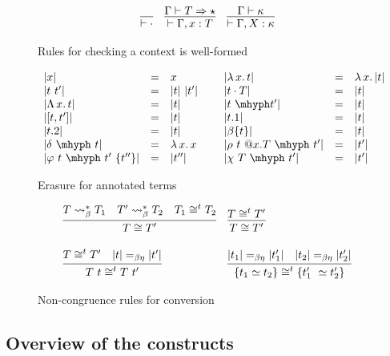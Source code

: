 \documentclass{article}
\newcommand{\absu}[3]{{#1}\, #2.\, #3}
\newcommand{\tpsynth}[0]{\Rightarrow}
\begin{document}
\begin{figure}
  \centering
  \[
    \begin{array}{lll}
      \infer{\vdash \cdot}{}
      & \infer{
        \vdash \Gamma,x:T
        }{\Gamma \vdash T \tpsynth \star}
      & \infer{
        \vdash \Gamma,X:\kappa
        }{
        \Gamma \vdash \kappa
        }
    \end{array}
  \]
  \caption{Rules for checking a context is well-formed}
  \label{fig:ctxt}
\end{figure}


\begin{figure}
  \[
  \begin{array}{lllllll}
    |x| & = & x &\ &
    |\absu{\lambda}{x}{t}| & = & \absu{\lambda}{x}{|t|} \\
    |t\ t'| & = & |t|\ |t'| &\ &
    |t\cdot T| & = & |t| \\
    |\absu{\Lambda}{x}{t}| & = & |t| &\ &
    |t\ \mhyph t'| & = & |t| \\
    |[t , t']| & = & |t| &\ &
    |t.1| & = & |t| \\
    |t.2| & = & |t| &\ &
    |\beta\{t\}| & = & |t|\\
    |\delta\ \mhyph\ t| & = & \absu{\lambda}{x}{x}&\ &
    |\rho\ t\ @x.T\ \mhyph\ t'| & = & |t'| \\
    |\varphi\ t\ \mhyph\ t'\ \{t''\}| & = & |t''| &\ &
    |\chi\ T\ \mhyph\ t'| & = & |t'|
  \end{array}
  \]
  \caption{Erasure for annotated terms}
  \label{fig:eraser}
\end{figure}  

\begin{figure}
  \[
  \begin{array}{ll}
    \infer{T \cong T'}{T \leadsto^*_\beta T_1 & T' \leadsto^*_\beta T_2 & T_1\cong^t T_2}  & 
    \infer{T \cong T'}{T \cong^t T'} \\ \\
    \infer{T\ t \cong^t T\ t'}{T \cong^t T' & |t| =_{\beta\eta} |t'|} &
    \infer{\{ t_1 \simeq t_2 \} \cong^t \{ t_1'\ \simeq t_2' \}}{|t_1| =_{\beta\eta} |t_1'| & |t_2| =_{\beta\eta} |t_2'|}
  \end{array}
  \]
  \caption{Non-congruence rules for conversion}
  \label{fig:conv}
\end{figure}  

\subsection{Overview of the constructs}
\label{sec:overview}
\end{document}
